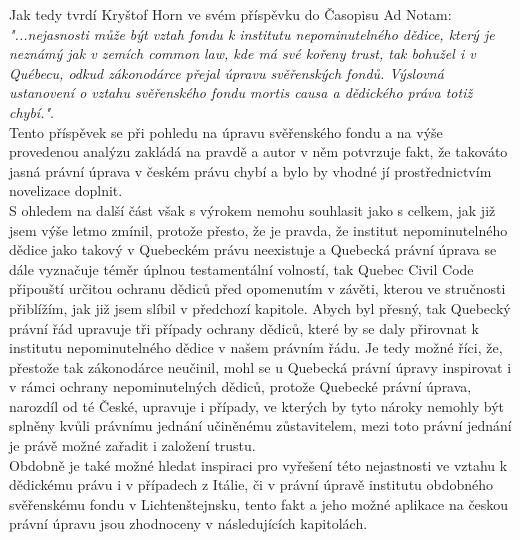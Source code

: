 \documentclass{article}
\begin{document}


Jak tedy tvrdí Kryštof Horn ve svém příspěvku do Časopisu Ad Notam: \textit{"...nejasnosti může být vztah fondu k institutu nepominutelného dědice, který je neznámý jak v zemích common law, kde má své kořeny trust, tak bohužel i v Québecu, odkud zákonodárce přejal úpravu svěřenských fondů. Výslovná ustanovení o vztahu svěřenského fondu mortis causa a dědického práva totiž chybí."}.  \\

Tento příspěvek se při pohledu na úpravu svěřenského fondu a na výše provedenou analýzu zakládá na pravdě a autor v něm potvrzuje fakt, že takováto jasná právní úprava v českém právu chybí a bylo by vhodné jí prostřednictvím novelizace doplnit.\\

S ohledem na další část však s výrokem nemohu souhlasit jako s celkem, jak již jsem výše letmo zmínil, protože přesto, že je pravda, že institut nepominutelného dědice jako takový v Quebeckém právu neexistuje a Quebecká právní úprava se dále vyznačuje téměr úplnou testamentální volností, tak Quebec Civil Code připouští určitou ochranu dědiců před opomenutím v závěti, kterou ve stručnosti přiblížím, jak již jsem slíbil v předchozí kapitole. Abych byl přesný, tak Quebecký právní řád upravuje tři případy ochrany dědiců, které by se daly přirovnat k institutu nepominutelného dědice v našem právním řádu. Je tedy možné říci, že, přestože tak zákonodárce neučinil, mohl se u Quebecká právní úpravy inspirovat i v rámci ochrany nepominutelných dědiců, protože Quebecké právní úprava, narozdíl od té České, upravuje i případy, ve kterých by tyto nároky nemohly být splněny kvůli právnímu jednání učiněnému zůstavitelem, mezi toto právní jednání je právě možné zařadit i založení trustu. \\

Obdobně je také možné hledat inspiraci pro vyřešení této nejastnosti ve vztahu k dědickému právu i v případech z Itálie, či v právní úpravě institutu obdobného svěřenskému fondu v Lichtenštejnsku, tento fakt a jeho možné aplikace na českou právní úpravu jsou zhodnoceny v následujících kapitolách. \\
\end{document}
